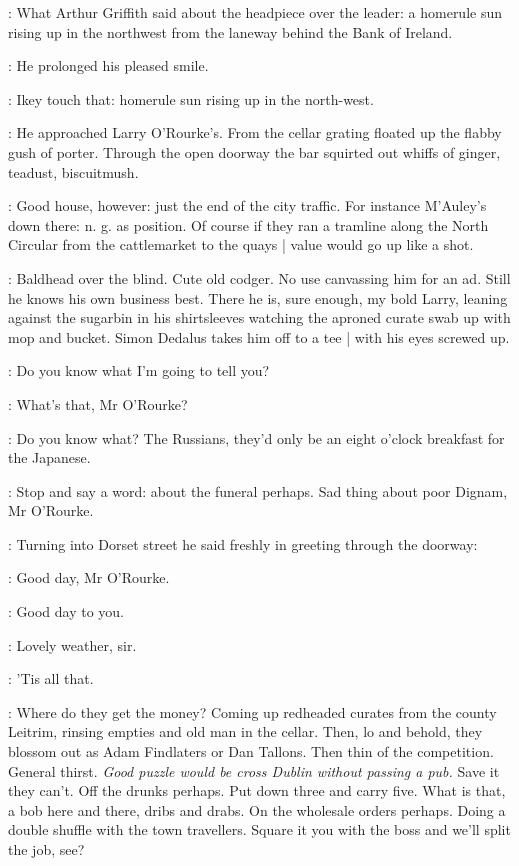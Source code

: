 \BloomInt:
What Arthur Griffith said about the headpiece over the  leader:
a homerule sun rising up in the northwest
from the laneway behind the Bank of Ireland.

:
He prolonged his pleased smile.

\BloomInt:
Ikey touch that:
homerule sun
rising up in the north-west.

:
He approached Larry O'Rourke's.
From the cellar grating
floated up the flabby gush of porter.
Through the open doorway
the bar squirted out whiffs of ginger, teadust, biscuitmush.

\BloomInt:
Good house, however:
just the end of the city traffic.
For instance M'Auley's down there:
n. g. as position.
Of course
if they ran a tramline along the North Circular from the cattlemarket to the quays |
value would go up like a shot.

\BloomInt:
Baldhead over the blind.
Cute old codger.
No use canvassing him for an ad.
Still he knows his own business best.
There he is, sure enough, my bold Larry,
leaning against the sugarbin in his shirtsleeves
watching the aproned curate swab up with mop and bucket.
Simon Dedalus takes him off to a tee |
with his eyes screwed up.

\ORourke:
Do you know what I'm going to tell you?

\Simon:
What's that, Mr O'Rourke?

\ORourke:
Do you know what?
The Russians, they'd only be an eight o'clock breakfast for the Japanese.

\BloomInt:
Stop and say a word:
about the funeral perhaps.
Sad thing about poor Dignam, Mr O'Rourke.

:
Turning into Dorset street
he said freshly in greeting through the doorway:

\Bloom:
Good day, Mr O'Rourke.

\ORourke:
Good day to you.

\Bloom:
Lovely weather, sir.

\ORourke:
'Tis all that.

\BloomInt:
Where do they get the money?
Coming up redheaded curates from the county Leitrim,
rinsing empties and old man in the cellar.
Then, lo and behold,
they blossom out as Adam Findlaters or Dan Tallons.
Then thin of the competition.
General thirst.
\emph{Good puzzle would be cross Dublin without passing a pub.}
Save it they can't.
Off the drunks perhaps.
Put down three and carry five.
What is that, a bob here and there, dribs and drabs.
On the wholesale orders perhaps.
Doing a double shuffle with the town travellers.
Square it you with the boss and we'll split the job, see?

